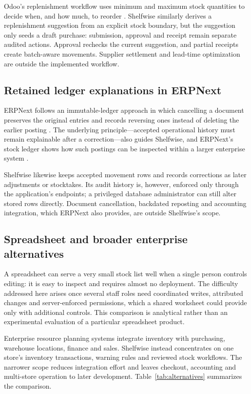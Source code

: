 Odoo's replenishment workflow uses minimum and maximum stock quantities to decide when, and how much, to reorder \citep{odoo}. Shelfwise similarly derives a replenishment suggestion from an explicit stock boundary, but the suggestion only seeds a draft purchase: submission, approval and receipt remain separate audited actions. Approval rechecks the current suggestion, and partial receipts create batch-aware movements. Supplier settlement and lead-time optimization are outside the implemented workflow.


\subsection{Retained ledger explanations in ERPNext}

ERPNext follows an immutable-ledger approach in which cancelling a document preserves the original entries and records reversing ones instead of deleting the earlier posting \citep{erpnext}. The underlying principle—accepted operational history must remain explainable after a correction—also guides Shelfwise, and ERPNext's stock ledger shows how such postings can be inspected within a larger enterprise system \citep{erpnext-stock}.


Shelfwise likewise keeps accepted movement rows and records corrections as later adjustments or stocktakes. Its audit history is, however, enforced only through the application's endpoints; a privileged database administrator can still alter stored rows directly. Document cancellation, backdated reposting and accounting integration, which ERPNext also provides, are outside Shelfwise's scope.


\subsection{Spreadsheet and broader enterprise alternatives}

A spreadsheet can serve a very small stock list well when a single person controls editing: it is easy to inspect and requires almost no deployment. The difficulty addressed here arises once several staff roles need coordinated writes, attributed changes and server-enforced permissions, which a shared worksheet could provide only with additional controls. This comparison is analytical rather than an experimental evaluation of a particular spreadsheet product.


Enterprise resource planning systems integrate inventory with purchasing, warehouse locations, finance and sales. Shelfwise instead concentrates on one store's inventory transactions, warning rules and reviewed stock workflows. The narrower scope reduces integration effort and leaves checkout, accounting and multi-store operation to later development. Table~\ref{tab:alternatives} summarizes the comparison.


